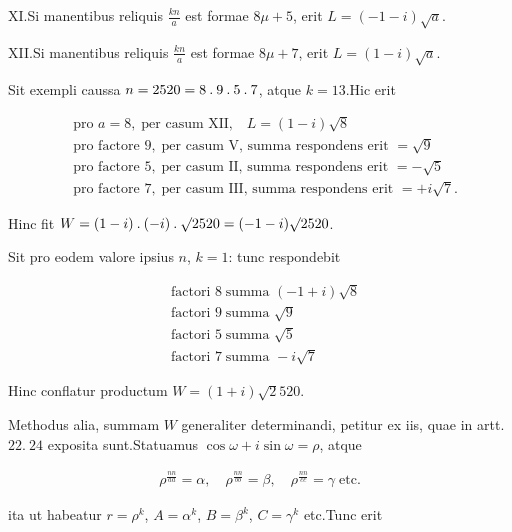XI.\quad Si manentibus reliquis $\frac{kn}{a}$ est formae $8\mu+5$, erit $L=(-1-i)\surd a$.

XII.\quad Si manentibus reliquis $\frac{kn}{a}$ est formae $8\mu+7$, erit $L=(1-i)\surd a$.


Sit exempli caussa $n=2520=8\mathbin{.}9\mathbin{.}5\mathbin{.}7$, atque $k=13$.\quad Hic erit

{\small
\[
\begin{aligned}
&\text{pro }a=8,\;\text{per casum XII,}\quad L=(1-i)\surd8\\
&\text{pro factore }9,\;\text{per casum V, summa respondens erit }=\surd9\\
&\text{pro factore }5,\;\text{per casum II, summa respondens erit }=-\surd5\\
&\text{pro factore }7,\;\text{per casum III, summa respondens erit }=+i\surd7\mathord{.}
\end{aligned}
\]
}

Hinc fit $W=(1-i)\mathbin{.}(-i)\mathbin{.}\surd2520=(-1-i)\surd2520$.

Sit pro eodem valore ipsius $n$, $k=1$: tunc respondebit

\[
\begin{aligned}
&\text{factori }8\;\text{summa }(-1+i)\surd8\\
&\text{factori }9\;\text{summa }\surd9\\
&\text{factori }5\;\text{summa }\surd5\\
&\text{factori }7\;\text{summa }-i\surd7
\end{aligned}
\]

Hinc conflatur productum $W=(1+i)\surd2520$.


Methodus alia, summam $W$ generaliter determinandi, petitur ex iis, quae in artt. $22.\ 24$ exposita sunt.\quad Statuamus $\cos\omega+i\sin\omega=\rho$, atque

\[
\begin{aligned}
\rho^{\frac{nn}{aa}}=\alpha,\quad\rho^{\frac{nn}{bb}}=\beta,\quad\rho^{\frac{nn}{cc}}=\gamma\;\text{etc.}
\end{aligned}
\]

ita ut habeatur $r=\rho^k$, $A=\alpha^k$, $B=\beta^k$, $C=\gamma^k$ etc.\quad Tunc erit

